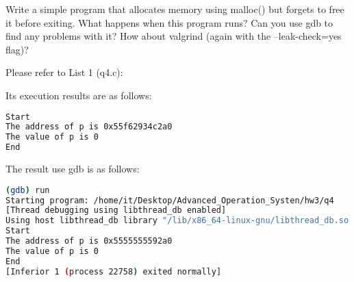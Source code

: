 \documentclass[10pt, answers]{exam}
\begin{document}
\begin{questions} 
    \setcounter{question}{3} 
    
    \question 
    Write a simple program that allocates memory using malloc() but
    forgets to free it before exiting. What happens when this program
    runs? Can you use gdb to find any problems with it? How about
    valgrind (again with the --leak-check=yes flag)?

    
    \begin{solution}
    Please refer to List 1 (q4.c):
    
    
    
    Its execution results are as follows:
    \begin{lstlisting}[language=bash]
Start
The address of p is 0x55f62934c2a0
The value of p is 0
End
    \end{lstlisting}

    The result use gdb is as follows:
    \begin{lstlisting}[language=bash]
(gdb) run
Starting program: /home/it/Desktop/Advanced_Operation_Systen/hw3/q4
[Thread debugging using libthread_db enabled]
Using host libthread_db library "/lib/x86_64-linux-gnu/libthread_db.so.1".
Start
The address of p is 0x5555555592a0
The value of p is 0
End
[Inferior 1 (process 22758) exited normally]
    \end{lstlisting}


\end{solution}
\end{questions}
\end{document}
